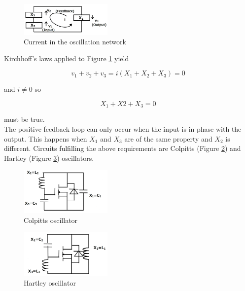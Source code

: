 \begin{figure}[H]
	\centering
	\includegraphics[width=0.4\textwidth]{pictures/theory/feedback_model_2.PNG}
	\caption{Current in the oscillation network}
	\label{fig:osc_model2}
\end{figure}

Kirchhoff's laws applied to Figure \ref{fig:osc_model2} yield

\begin{equation}
    v_1+v_2+v_3 = i(X_1+X_2+X_3) = 0
\end{equation}{}

and $i \neq 0 $ so

\begin{equation}
X_1+X2+X_3 = 0
\end{equation}

must be true. \\

The positive feedback loop can only occur when the input is in phase with the output. This happens when $X_1$ and $X_3$ are of the same property and $X_2$ is different. Circuits fulfilling the above requirements are Colpitts (Figure \ref{fig:colpitts_1}) and Hartley (Figure \ref{fig:hartley_1}) oscillators.

\begin{figure}[H]
	\centering
	\includegraphics[width=0.4\textwidth]{pictures/theory/colpitts_1.PNG}
	\caption{Colpitts oscillator}
	\label{fig:colpitts_1}
\end{figure}

\begin{figure}[H]
	\centering
	\includegraphics[width=0.4\textwidth]{pictures/theory/hartley_1.PNG}
	\caption{Hartley oscillator}
	\label{fig:hartley_1}
\end{figure}

